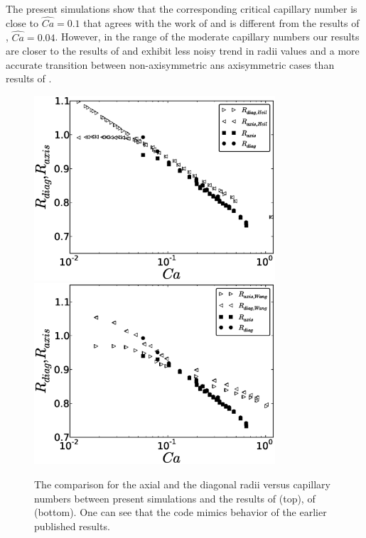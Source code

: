 \documentclass[preprint,12pt]{elsarticle}
\begin{document}
The present simulations show that the corresponding critical capillary number is close to
$\widehat{Ca}=0.1$ that agrees with the work of \citet{wang-non-circular} and is different from the
results of \citet{heil-threedim}, $\widehat{Ca}=0.04$. However, in the range of the moderate
capillary numbers our results are closer to the results of \citet{heil-threedim} and exhibit
less noisy trend in radii values and a more accurate transition between non-axisymmetric ans
axisymmetric cases than results of \citet{wang-non-circular}. 
\begin{figure}[ht]
\includegraphics[width=0.8\textwidth]{capillaries_comparison_heil.eps}\\
\includegraphics[width=0.8\textwidth]{capillaries_comparison_wang.eps}\\
\caption{The comparison for the axial and the diagonal radii
versus capillary numbers between present simulations and the results of \citet{heil-threedim}
(top), of \citet{wang-non-circular} (bottom). One can see that
the code mimics
behavior of the earlier published results.  \label{fig:capillary:comparison}} 
\end{figure}
\end{document}
